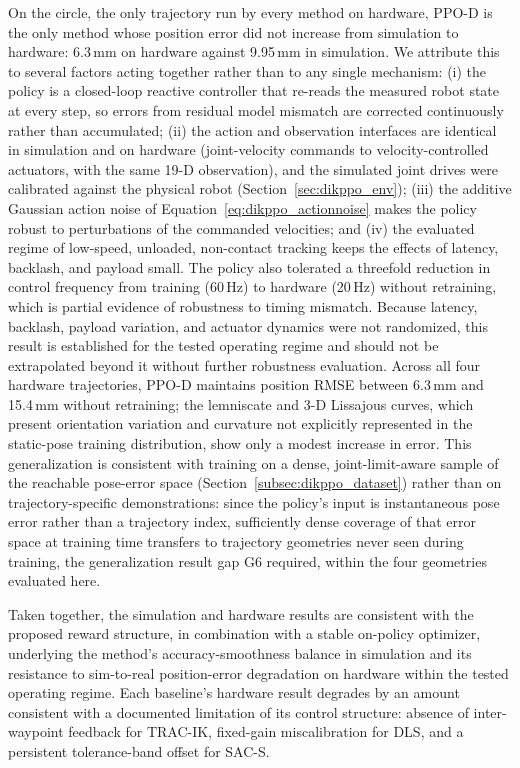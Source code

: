 On the circle, the only trajectory run by every method on hardware, PPO-D is the only method whose
position error did not increase from simulation to hardware: 6.3\,mm on hardware against 9.95\,mm
in simulation. We attribute this to several factors acting together rather than to any single
mechanism: (i) the policy is a closed-loop reactive controller that re-reads the measured robot
state at every step, so errors from residual model mismatch are corrected continuously rather than
accumulated; (ii) the action and observation interfaces are identical in simulation and on hardware
(joint-velocity commands to velocity-controlled actuators, with the same 19-D observation), and the
simulated joint drives were calibrated against the physical robot (Section~\ref{sec:dikppo_env});
(iii) the additive Gaussian action noise of Equation~\eqref{eq:dikppo_actionnoise} makes the policy
robust to perturbations of the commanded velocities; and (iv) the evaluated regime of low-speed,
unloaded, non-contact tracking keeps the effects of latency, backlash, and payload small. The policy
also tolerated a threefold reduction in control frequency from training (60\,Hz) to hardware (20\,Hz)
without retraining, which is partial evidence of robustness to timing mismatch. Because latency,
backlash, payload variation, and actuator dynamics were not randomized, this result is established
for the tested operating regime and should not be extrapolated beyond it without further robustness
evaluation. Across all four hardware trajectories, PPO-D maintains position RMSE between 6.3\,mm and
15.4\,mm without retraining; the lemniscate and 3-D Lissajous curves, which present orientation
variation and curvature not explicitly represented in the static-pose training distribution, show
only a modest increase in error. This generalization is consistent with training on a dense,
joint-limit-aware sample of the reachable pose-error space (Section~\ref{subsec:dikppo_dataset})
rather than on trajectory-specific demonstrations: since the policy's input is instantaneous pose
error rather than a trajectory index, sufficiently dense coverage of that error space at training
time transfers to trajectory geometries never seen during training, the generalization result gap G6
required, within the four geometries evaluated here.

Taken together, the simulation and hardware results are consistent with the proposed reward
structure, in combination with a stable on-policy optimizer, underlying the method's
accuracy-smoothness balance in simulation and its resistance to sim-to-real position-error
degradation on hardware within the tested operating regime. Each baseline's hardware result degrades
by an amount consistent with a documented limitation of its control structure: absence of
inter-waypoint feedback for TRAC-IK, fixed-gain miscalibration for DLS, and a persistent
tolerance-band offset for SAC-S.

